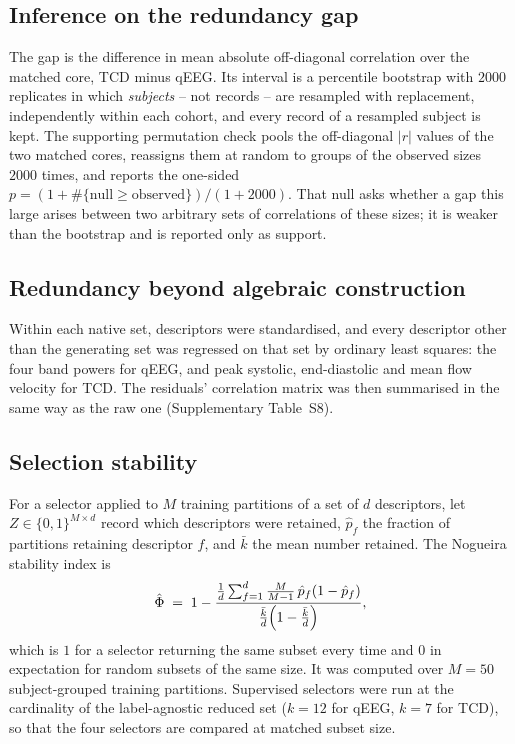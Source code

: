\documentclass[10pt,a4paper]{article}
\begin{document}
\subsection{Inference on the redundancy gap}

The gap is the difference in mean absolute off-diagonal correlation over the
matched core, TCD minus qEEG. Its interval is a percentile bootstrap with
$2000$ replicates in which \emph{subjects} -- not records -- are resampled with
replacement, independently within each cohort, and every record of a resampled
subject is kept. The supporting permutation check pools the off-diagonal
$|r|$ values of the two matched cores, reassigns them at random to groups of
the observed sizes $2000$ times, and reports the one-sided $p =
(1 + \#\{\text{null} \ge \text{observed}\})/(1 + 2000)$. That null asks
whether a gap this large arises between two arbitrary sets of correlations of
these sizes; it is weaker than the bootstrap and is reported only as support.

\subsection{Redundancy beyond algebraic construction}

Within each native set, descriptors were standardised, and every descriptor
other than the generating set was regressed on that set by ordinary least
squares: the four band powers for qEEG, and peak systolic, end-diastolic and
mean flow velocity for TCD. The residuals' correlation matrix was then
summarised in the same way as the raw one (Supplementary Table~S8).

\subsection{Selection stability}

For a selector applied to $M$ training partitions of a set of $d$
descriptors, let $Z \in \{0,1\}^{M\times d}$ record which descriptors were
retained, $\hat p_f$ the fraction of partitions retaining descriptor $f$, and
$\bar k$ the mean number retained. The Nogueira stability index is
\begin{equation}
\hat\Phi \;=\; 1 - \frac{\frac{1}{d}\sum_{f=1}^{d}\frac{M}{M-1}\,\hat p_f(1-\hat p_f)}
{\frac{\bar k}{d}\Bigl(1-\frac{\bar k}{d}\Bigr)} ,
\end{equation}
which is $1$ for a selector returning the same subset every time and $0$ in
expectation for random subsets of the same size. It was computed over $M = 50$
subject-grouped training partitions. Supervised selectors were run at the
cardinality of the label-agnostic reduced set ($k = 12$ for qEEG, $k = 7$ for
TCD), so that the four selectors are compared at matched subset size.
\end{document}
